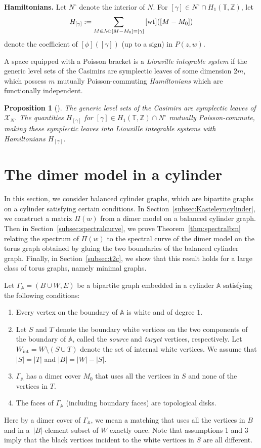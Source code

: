 \documentclass[pdftex]{sigma}
\numberwithin{equation}{section}
\newtheorem{Proposition}[Theorem]{Proposition}
 { \theoremstyle{definition}
\newtheorem{Definition}[Theorem]{Definition}
\newtheorem{Note}[Theorem]{Note}
\newtheorem{Example}[Theorem]{Example}
\newtheorem{Remark}[Theorem]{Remark} }
\newcommand{\Z}{{\mathbb Z}}
\newcommand{\T}{{\mathbb T}}
\newcommand{\A}{{\mathbb A}}
\newcommand{\la}{\label}
\begin{document}
	
	{\bf Hamiltonians.}
	Let $N^\circ$ denote the interior of $N$. For $[\gamma] \in N^\circ \cap H_1(\T,\Z)$, let
	\[
	H_{[\gamma]}:=\sum_{M \in \mathcal M: [M-M_0]=[\gamma]} {[\rm wt]}([M-M_0])
	\]
	denote the coefficient of $[\phi]([\gamma])$ (up to a sign) in $P(z,w)$.
	
	A space equipped with a Poisson bracket is a \emph{Liouville integrable system} if the generic level sets of the Casimirs are symplectic leaves of some dimension $2m$, which possess $m$ mutually Poisson-commuting \emph{Hamiltonians} which are functionally independent.
	
	\begin{Proposition}[]
		The generic level sets of the Casimirs are symplectic leaves of $\mathcal X_N$. The quantities $H_{[\gamma]}$ for $[\gamma] \in H_1(\T,\Z) \cap N^\circ$ mutually Poisson-commute, making these symplectic leaves into Liouville integrable systems with Hamiltonians $H_{[\gamma]}$.
	\end{Proposition}
	
	
	
	\section{The dimer model in a cylinder}
	\la{sec:cyl}
	
	In this section, we consider balanced cylinder graphs, which are bipartite graphs on a cylinder satisfying certain conditions. In Section~\ref{subsec:Kasteleyncylinder}, we construct a matrix $\Pi(w)$ from a dimer model on a balanced cylinder graph. Then in Section~\ref{subsec:spectralcurve}, we prove Theorem~\ref{thm:spectralbm} relating the spectrum of $\Pi(w)$ to the spectral curve of the dimer model on the torus graph obtained by gluing the two boundaries of the balanced cylinder graph. Finally, in Section~\ref{subsec:t2c}, we show that this result holds for a large class of torus graphs, namely minimal graphs.
	
	Let $\Gamma_{\A}=(B \cup W,E)$ be a bipartite graph embedded in a cylinder $\A$ satisfying the following conditions:
	\begin{enumerate}\itemsep=0pt
\item Every vertex on the boundary of $\A$ is white and of degree $1$.
		\item Let $S$ and $T$ denote the boundary white vertices on the two components of the boundary of $\A$, called the \emph{source} and \emph{target} vertices, respectively. Let $W_{\text{int}}=W \setminus(S \cup T)$ denote the set of internal white vertices. We assume that $|S|=|T|$ and $|B|=|W|-|S|$.
		\item $\Gamma_\A$ has a dimer cover $M_0$ that uses all the vertices in $S$ and none of the vertices in $T$.
		\item The faces of $\Gamma_\A$ (including boundary faces) are topological disks.
	\end{enumerate}
	Here by a dimer cover of $\Gamma_\A$, we mean a matching that uses all the vertices in $B$ and in \mbox{a~$|B|$-element} subset of $W$ exactly once. Note that assumptions 1 and 3 imply that the black vertices incident to the white vertices in $S$ are all different.
	
\end{document}
